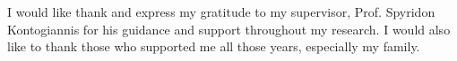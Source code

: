 \chapter*{\cseeuxaristies}

I would like thank and express my gratitude to my supervisor, Prof. Spyridon Kontogiannis for his guidance and support throughout my research. I would also like to thank those who supported me all those years, especially my family.

\bigskip

